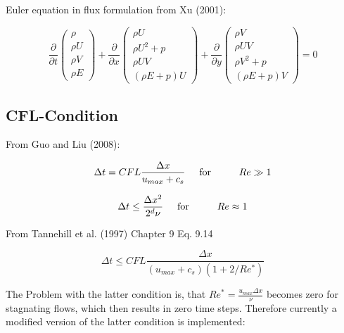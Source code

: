 \documentclass[
	pdftex,             %
	12pt,				%
	a4paper,		   	%
	english,				%
	oneside,			%
]{article}
\begin{document}
Euler equation in flux formulation from Xu (2001):

\begin{equation}
\dfrac{\partial}{\partial t}
\begin{pmatrix}
\rho \\ \rho U \\ \rho V \\ \rho E
\end{pmatrix}
+
\dfrac{\partial}{\partial x}
\begin{pmatrix}
\rho U \\ \rho U^2 + p \\ \rho U V \\ (\rho E + p)U
\end{pmatrix}
+
\dfrac{\partial}{\partial y}
\begin{pmatrix}
\rho V \\ \rho U V \\ \rho V^2 + p \\ (\rho E + p)V
\end{pmatrix}
=0
\end{equation}

\subsection{CFL-Condition}

From Guo and Liu (2008):

\begin{equation}
\Delta t = CFL \dfrac{\Delta x}{u_{max} + c_s}
\hspace{0.5cm} \textnormal{for} \hspace{1cm}
Re \gg 1
\end{equation}

\begin{equation}
\Delta t \leq \dfrac{\Delta x^2}{2^d \nu}
\hspace{0.5cm} \textnormal{for} \hspace{1cm}
Re \approx 1
\end{equation}

From Tannehill et al. (1997) Chapter 9 Eq. 9.14

\begin{equation}
\Delta t \leq CFL \dfrac{\Delta x}{(u_{max} + c_s)(1 + 2/Re^*)}
\end{equation}

The Problem with the latter condition is, that $Re^* = \frac{u_{max} \Delta x}{\nu}$ becomes zero for stagnating flows, which then results in zero time steps. Therefore currently a modified version of the latter condition is implemented:
\end{document}

